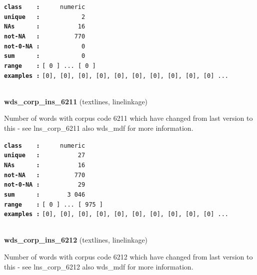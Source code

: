 \documentclass[]{article}
\begin{document}
\textbf{\texttt{class\ \ \ \ :}} \texttt{~~~~~numeric}\\
\textbf{\texttt{unique\ \ \ :}} \texttt{~~~~~~~~~~~2}\\
\textbf{\texttt{NAs\ \ \ \ \ \ :}} \texttt{~~~~~~~~~~16}\\
\textbf{\texttt{not-NA\ \ \ :}} \texttt{~~~~~~~~~770}\\
\textbf{\texttt{not-0-NA\ :}} \texttt{~~~~~~~~~~~0}\\
\textbf{\texttt{sum\ \ \ \ \ \ :}} \texttt{~~~~~~~~~~~0}\\
\textbf{\texttt{range\ \ \ \ :}}
\texttt{{[}\ 0\ {]}\ ...\ {[}\ 0\ {]}}\\
\textbf{\texttt{examples\ :}}
\texttt{{[}0{]},\ {[}0{]},\ {[}0{]},\ {[}0{]},\ {[}0{]},\ {[}0{]},\ {[}0{]},\ {[}0{]},\ {[}0{]},\ {[}0{]}\ ...}\\

~

\textbf{wds\_corp\_ins\_6211} (textlines, linelinkage)

Number of words with corpus code 6211 which have changed from last
version to this - see lns\_corp\_6211 also wds\_mdf for more
information.

\textbf{\texttt{class\ \ \ \ :}} \texttt{~~~~~numeric}\\
\textbf{\texttt{unique\ \ \ :}} \texttt{~~~~~~~~~~27}\\
\textbf{\texttt{NAs\ \ \ \ \ \ :}} \texttt{~~~~~~~~~~16}\\
\textbf{\texttt{not-NA\ \ \ :}} \texttt{~~~~~~~~~770}\\
\textbf{\texttt{not-0-NA\ :}} \texttt{~~~~~~~~~~29}\\
\textbf{\texttt{sum\ \ \ \ \ \ :}} \texttt{~~~~~~~3~046}\\
\textbf{\texttt{range\ \ \ \ :}}
\texttt{{[}\ 0\ {]}\ ...\ {[}\ 975\ {]}}\\
\textbf{\texttt{examples\ :}}
\texttt{{[}0{]},\ {[}0{]},\ {[}0{]},\ {[}0{]},\ {[}0{]},\ {[}0{]},\ {[}0{]},\ {[}0{]},\ {[}0{]},\ {[}0{]}\ ...}\\

~

\textbf{wds\_corp\_ins\_6212} (textlines, linelinkage)

Number of words with corpus code 6212 which have changed from last
version to this - see lns\_corp\_6212 also wds\_mdf for more
information.
\end{document}
